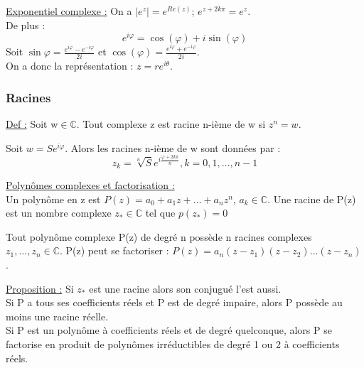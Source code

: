 \documentclass[../main.tex]{subfiles}
\begin{document}
\quad \underline{Exponentiel complexe :} On a $|e^z| = e^{Re(z)}$; $e^{z+2k\pi} = e^z$.\\
De plus :\\
\begin{equation}
    e^{i\varphi} = \cos(\varphi) + i \sin(\varphi)
\end{equation}
Soit $\sin{\varphi} = \frac{e^{i\varphi}-e^{-i\varphi}}{2i}$ et $\cos(\varphi) = \frac{e^{i\varphi}+e^{-i\varphi}}{2i}$.\\
On a donc la représentation : $z = re^{i\theta}$.\\

\subsubsection{Racines}
\underline{Def :} Soit w$\in \mathbb{C}$. Tout complexe z est racine n-ième de w si $z^n = w$.\\

\begin{theorem}
    Soit $w = S e^{i\varphi}$. Alors les racines n-ième de w sont données par : \\
\begin{equation}
    z_k = \sqrt[n]{S} e^{i \frac{\varphi + 2k\pi}{n}}, k=0,1,\dots, n-1
\end{equation}
\end{theorem}


\quad \underline{Polynômes complexes et factorisation :}\\
Un polynôme en z est $P(z) = a_0 + a_1z + \dots + a_n z^n$, $a_k\in \mathbb{C}$. Une racine de P(z) est un nombre complexe $z_* \in \mathbb{C}$ tel que $p(z_*) = 0$\\

\begin{theorem}
    Tout polynôme complexe P(z) de degré n possède n racines complexes $z_1, \dots, z_n \in \mathbb{C}$. P(z) peut se factoriser : $P(z) = a_n(z-z_1)(z-z_2)\dots(z-z_n)$.
\end{theorem}

\underline{Proposition :} Si $z_*$ est une racine alors son conjugué l'est aussi. \\
Si P a tous ses coefficients réels et P est de degré impaire, alors P possède au moins une racine réelle.\\
Si P est un  polynôme à coefficients réels et de degré quelconque, alors P se factorise en produit de polynômes irréductibles de degré 1 ou 2 à coefficients réels.\\
\end{document}

